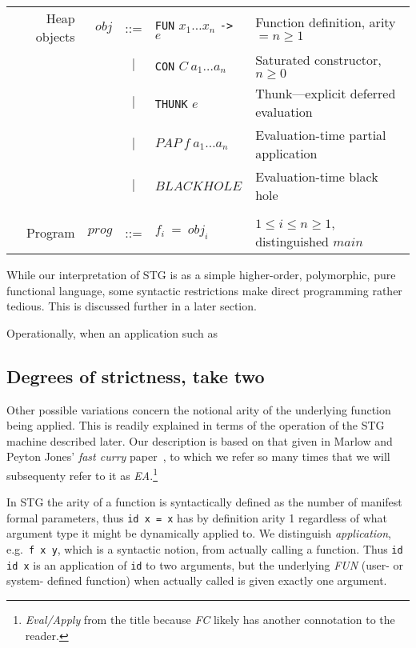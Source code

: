 \documentclass{llncs}
\begin{document}
\begin{table}
\begin{tabular}{r r c l l}
\\
Heap objects & $\mathit{obj}$ & ::= &\texttt{FUN} $x_1\dots x_n$ \texttt{->} $e$   & Function definition, arity $=n\ge 1$ \\
             &                & $|$ &\texttt{CON} $C\ a_1\dots a_n$                & Saturated constructor, $n \ge 0$ \\
             &                & $|$ &\texttt{THUNK} $e$                            & Thunk---explicit deferred evaluation \\
             &                & $|$ & $\mathit{PAP}\ f\ a_1\dots a_n$               & Evaluation-time partial application \\
             &                & $|$ & $\mathit{BLACKHOLE}$                         & Evaluation-time black hole \\
\\
Program      & $\mathit{prog}$& ::= & $f_i\ =\ \mathit{obj}_i$                      & $1\le i \le n \ge 1$, distinguished $\mathit{main}$ \\

\end{tabular}
\end{table}

While our interpretation of STG is as a simple higher-order, polymorphic, pure
functional language, some syntactic restrictions make direct programming
rather tedious.  This is discussed further in a later section.

Operationally, when an application such as 

\subsection{Degrees of strictness, take two}

Other possible variations concern the notional arity of the underlying
function being applied.  This is readily explained in terms of the operation
of the STG machine described later.  Our description is based on that given in
Marlow and Peyton Jones' \emph{fast curry} paper~\cite{fastcurry}, to which we
refer so many times that we will subsequenty refer to it as
\emph{EA}.\footnote{\emph{Eval/Apply} from the title because \emph{FC} likely
  has another connotation to the reader.}

In STG the arity of a function is syntactically defined as the number of
manifest formal parameters, thus \texttt{id x = x} has by definition arity 1
regardless of what argument type it might be dynamically applied to.  We
distinguish \emph{application}, e.g.\ \texttt{f x y}, which is a syntactic
notion, from actually calling a function. Thus \texttt{id id x} is an
application of \texttt{id} to two arguments, but the underlying \emph{FUN}
(user- or system- defined function) when actually called is given exactly one
argument.
\end{document}

